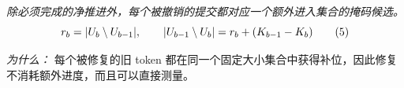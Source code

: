 \documentclass[10pt,a4paper]{article}
\begin{document}
\begin{enumerate}[leftmargin=*,start=6]
\noindent\emph{除必须完成的净推进外，每个被撤销的提交都对应一个额外进入集合的掩码候选。}
\begin{equation}
\resizebox{\ifdim\width>\linewidth \linewidth\else\width\fi}{!}{$\displaystyle r_b=|U_b\setminus U_{b-1}|,\qquad |U_{b-1}\setminus U_b|=r_b+(K_{b-1}-K_b)$} \tag{5}
\end{equation}
\par\emph{为什么：} 每个被修复的旧 token 都在同一个固定大小集合中获得补位，因此修复不消耗额外进度，而且可以直接测量。
\end{enumerate}
\end{document}
